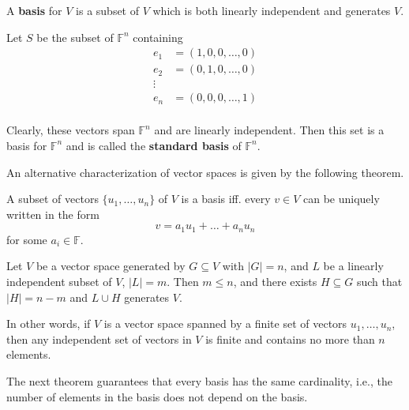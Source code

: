 \begin{definition}[Basis]
	A \textbf{basis} for $V$ is a subset of $V$ which is both linearly independent and generates $V$.
\end{definition}

\begin{example}
	Let $S$ be the subset of $\mathbb{F}^n$ containing
	\begin{equation*}
		\begin{aligned}
			e_1 &= (1, 0, 0, \ldots, 0) \\
			e_2 &= (0, 1, 0, \ldots, 0) \\
			\vdots \\
			e_n &= (0, 0, 0, \ldots, 1) \\
		\end{aligned}
	\end{equation*}
	
	Clearly, these vectors span $\mathbb{F}^n$ and are linearly independent. Then this set is a basis for $\mathbb{F}^n$ and is called the \textbf{standard basis} of $\mathbb{F}^n$.
\end{example}

An alternative characterization of vector spaces is given by the following theorem.

\begin{theorem}
	A subset of vectors $\{ u_1, \ldots, u_n \}$ of $V$ is a basis iff. every $v \in V$ can be uniquely written in the form
	\[
		v = a_1 u_1 + \ldots + a_n u_n 
	\]
	for some $a_i \in \mathbb{F}$.
\end{theorem}


\begin{theorem}
	Let $V$ be a vector space generated by $G \subseteq V$ with $|G| = n$, and $L$ be a linearly independent subset of $V$, $|L| = m$. Then $m \leq n$, and there exists $H \subseteq G$ such that $|H| = n-m$ and $L \cup H$ generates $V$.
\end{theorem}

In other words, if $V$ is a vector space spanned by a finite set of vectors $u_1, \ldots, u_n$, then any independent set of vectors in $V$ is finite and contains no more than $n$ elements.

The next theorem guarantees that every basis has the same cardinality, i.e., the number of elements in the basis does not depend on the basis.

